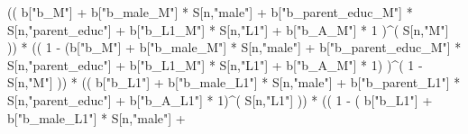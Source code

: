 \documentclass[
]{book}
\newenvironment{Shaded}{\begin{snugshade}}{\end{snugshade}}
\newcommand{\DecValTok}[1]{\textcolor[rgb]{0.00,0.00,0.81}{#1}}
\newcommand{\NormalTok}[1]{#1}
\newcommand{\SpecialCharTok}[1]{\textcolor[rgb]{0.00,0.00,0.00}{#1}}
\newcommand{\StringTok}[1]{\textcolor[rgb]{0.31,0.60,0.02}{#1}}
\begin{document}
\begin{Shaded}
\begin{Highlighting}[]
\NormalTok{                    (( b[}\StringTok{"b\_M"}\NormalTok{] }\SpecialCharTok{+} 
\NormalTok{                           b[}\StringTok{"b\_male\_M"}\NormalTok{] }\SpecialCharTok{*}\NormalTok{ S[n,}\StringTok{"male"}\NormalTok{] }\SpecialCharTok{+} 
\NormalTok{                           b[}\StringTok{"b\_parent\_educ\_M"}\NormalTok{] }\SpecialCharTok{*}\NormalTok{ S[n,}\StringTok{"parent\_educ"}\NormalTok{] }\SpecialCharTok{+} 
\NormalTok{                           b[}\StringTok{"b\_L1\_M"}\NormalTok{] }\SpecialCharTok{*}\NormalTok{ S[n,}\StringTok{"L1"}\NormalTok{] }\SpecialCharTok{+}
\NormalTok{                           b[}\StringTok{"b\_A\_M"}\NormalTok{] }\SpecialCharTok{*} \DecValTok{1}\NormalTok{ )}\SpecialCharTok{\^{}}\NormalTok{( S[n,}\StringTok{"M"}\NormalTok{] )) }\SpecialCharTok{*}
\NormalTok{                    (( }\DecValTok{1} \SpecialCharTok{{-}}\NormalTok{ (b[}\StringTok{"b\_M"}\NormalTok{] }\SpecialCharTok{+} 
\NormalTok{                              b[}\StringTok{"b\_male\_M"}\NormalTok{] }\SpecialCharTok{*}\NormalTok{ S[n,}\StringTok{"male"}\NormalTok{] }\SpecialCharTok{+} 
\NormalTok{                              b[}\StringTok{"b\_parent\_educ\_M"}\NormalTok{] }\SpecialCharTok{*}\NormalTok{ S[n,}\StringTok{"parent\_educ"}\NormalTok{] }\SpecialCharTok{+} 
\NormalTok{                              b[}\StringTok{"b\_L1\_M"}\NormalTok{] }\SpecialCharTok{*}\NormalTok{ S[n,}\StringTok{"L1"}\NormalTok{] }\SpecialCharTok{+}
\NormalTok{                              b[}\StringTok{"b\_A\_M"}\NormalTok{] }\SpecialCharTok{*} \DecValTok{1}\NormalTok{) )}\SpecialCharTok{\^{}}\NormalTok{( }\DecValTok{1} \SpecialCharTok{{-}}\NormalTok{ S[n,}\StringTok{"M"}\NormalTok{] )) }\SpecialCharTok{*}
\NormalTok{                        (( b[}\StringTok{"b\_L1"}\NormalTok{] }\SpecialCharTok{+}
\NormalTok{                             b[}\StringTok{"b\_male\_L1"}\NormalTok{] }\SpecialCharTok{*}\NormalTok{ S[n,}\StringTok{"male"}\NormalTok{] }\SpecialCharTok{+}  
\NormalTok{                             b[}\StringTok{"b\_parent\_L1"}\NormalTok{] }\SpecialCharTok{*}\NormalTok{ S[n,}\StringTok{"parent\_educ"}\NormalTok{] }\SpecialCharTok{+}
\NormalTok{                             b[}\StringTok{"b\_A\_L1"}\NormalTok{] }\SpecialCharTok{*} \DecValTok{1}\NormalTok{)}\SpecialCharTok{\^{}}\NormalTok{( S[n,}\StringTok{"L1"}\NormalTok{] )) }\SpecialCharTok{*}
\NormalTok{                        (( }\DecValTok{1} \SpecialCharTok{{-}}\NormalTok{ ( b[}\StringTok{"b\_L1"}\NormalTok{] }\SpecialCharTok{+}
\NormalTok{                                   b[}\StringTok{"b\_male\_L1"}\NormalTok{] }\SpecialCharTok{*}\NormalTok{ S[n,}\StringTok{"male"}\NormalTok{] }\SpecialCharTok{+}  

\end{Highlighting}
\end{Shaded}
\end{document}
